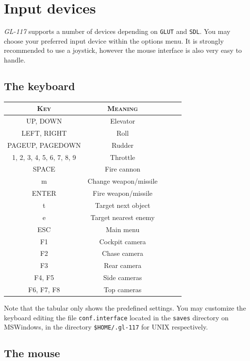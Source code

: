 \section{Input devices}
\label{sec:input_devices}

\emph{GL-117} supports a number of devices depending on \texttt{GLUT} and \texttt{SDL}.
You may choose your preferred input device within the options menu.
It is strongly recommended to use a joystick, however the mouse interface
is also very easy to handle.

\subsection{The keyboard}
\label{subsec:keyboard}

\begin{center}
\begin{tabular}{|c|c|l|l|l|}
\hline
\textsc{Key} & \textsc{Meaning}\\\hline
UP, DOWN & Elevator\\
LEFT, RIGHT & Roll\\
PAGEUP, PAGEDOWN & Rudder\\
1, 2, 3, 4, 5, 6, 7, 8, 9 & Throttle\\
\hline
SPACE & Fire cannon\\
m & Change weapon/missile\\
ENTER & Fire weapon/missile\\
\hline
t & Target next object\\
e & Target nearest enemy\\
\hline
ESC & Main menu\\
\hline
F1 & Cockpit camera\\
F2 & Chase camera\\
F3 & Rear camera\\
F4, F5 & Side cameras\\
F6, F7, F8 & Top cameras\\
\hline
\end{tabular}
\end{center}

Note that the tabular only shows the predefined settings. You may customize the
keyboard editing the file \texttt{conf.interface} located in the \texttt{saves}
directory on MSWindows, in the directory \texttt{\$HOME/.gl-117} for UNIX respectively.


\subsection{The mouse}
\label{subsec:mouse}


